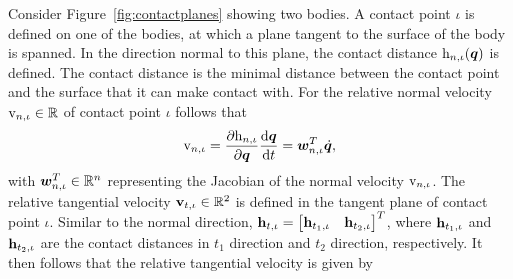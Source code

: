 \documentclass[../DC2019003Bouma.tex]{subfiles}
\begin{document}
Consider Figure~\ref{fig:contactplanes} showing two bodies. A contact point $\iota$ is defined on one of the bodies, at which a plane tangent to the surface of the body is spanned. In the direction normal to this plane, the contact distance $\mathrm{h}_{n,\iota}({\boldsymbol{q}})$ is defined. The contact distance is the minimal distance between the contact point and the surface that it can make contact with. For the relative normal velocity $\mathrm{v}_{n,\iota}\in\mathbb{R}$ of contact point $\iota$ follows that
\begin{align}
\mathrm{v}_{n,\iota} = \frac{\partial \mathrm{h}_{n,\iota}}{\partial{\boldsymbol{q}}}\frac{\text{d}{\boldsymbol{q}}}{\text{d} t} = {\boldsymbol{w}}_{n,\iota}^T\dot{{\boldsymbol{q}}},
\end{align}
%
%
%
%
%
%
%
%
%
%
%
%
%
%
%
%
%
%
%
%
%
with ${\boldsymbol{w}}^T_{n,\iota}\in\mathbb{R}^n$ representing the Jacobian of the normal velocity $\mathrm{v}_{n,\iota}$. The relative tangential velocity $\mathbf{v}_{t,\iota}\in\mathbb{R}^2$ is defined in the tangent plane of contact point $\iota$. Similar to the normal direction, $\mathbf{h}_{t,\iota} = \begin{bmatrix} \mathbf{h}_{t_1,\iota} & \mathbf{h}_{t_2,\iota} \end{bmatrix}^T$, where $\mathbf{h}_{t_1,\iota}$ and $\mathbf{h}_{t_2,\iota}$ are the contact distances in $t_1$ direction and $t_2$ direction, respectively. It then follows that the relative tangential velocity is given by
\end{document}
